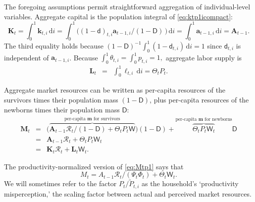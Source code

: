 \documentclass[titlepage]{./econtex}
\begin{document}
The foregoing assumptions permit straightforward aggregation of individual-level variables.  Aggregate capital is the population integral of \eqref{eq:ktp1icompact}:
\begin{equation*}
\mathbf{K}_{t} = \int_{0}^{1} \mathbf{k}_{t,i}\,\text{d}i = \int_{0}^{1} \big((1-\mathsf{d})_{t,i}\mathbf{a}_{t-1,i} \big/(1-\mathsf{D})\, \big)\,\text{d}i = \int_{0}^{1} \mathbf{a}_{t-1,i}\,\text{d}i = \mathbf{A}_{t-1}.   \label{eq:Ktp1}
\end{equation*}
 The third equality holds because $(1-\mathsf{D})^{-1}\int_{0}^{1}(1-\mathsf{d}_{t,i})\,\text{d}i = 1$
since $\mathsf{d}_{t,i}$ is independent of $\mathbf{a}_{t-1,i}$.
Because $\int_{0}^{1} \theta_{t,i} = \int_{0}^{1} {p}_{t,i} = 1,$ aggregate labor supply
is
\begin{eqnarray*}
  \label{eq:Lt}
  \mathbf{L}_{t} & = & \int_{0}^{1} \pmb{\ell}_{t,i}\,\text{d}i = \Theta_{t} {P}_{t}.
\end{eqnarray*}

Aggregate market resources can be written as per-capita resources of the survivors times their population mass $(1-\mathsf{D})$, plus per-capita resources of the newborns times their population mass $\mathsf{D}$: 
\begin{eqnarray}
  \mathbf{M}_{t} & = & \big(\overbrace{\mathbf{A}_{t-1} {\mathscr{R}}_t/(1-\mathsf{D})  + \Theta_{t} {P}_{t}\mathsf{W}}^{\text{per-capita $\mathbf{m}$ for survivors}}\big)(1-\mathsf{D})+\overbrace{\Theta_{t} {P}_{t}\mathsf{W}_t}^{\text{per-capita $\mathbf{m}$ for newborns}} \mathsf{D} \nonumber \\
                       & = & \mathbf{A}_{t-1} {\mathscr{R}}_t + \Theta_{t} P_t \mathsf{W}_t  \label{eq:Mtp1} \\
                       & = & \mathbf{K}_t \mathscr{R}_t + \mathbf{L}_t \mathsf{W}_t. \nonumber
\end{eqnarray}
 

The productivity-normalized version of \eqref{eq:Mtp1} says that
\begin{equation}\label{eq:Mtp1norm}
M_t = A_{t-1} \mathscr{R}_t\big/(\Psi_t \Phi_t) + \Theta_t \mathsf{W}_t.
\end{equation}
We will sometimes refer to the factor $P_t\big/\widetilde{P}_{t,i}$ as the household's `productivity misperception,' the scaling factor between actual and perceived market resources.
\end{document}
